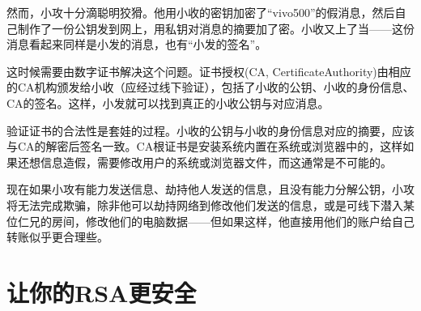 \documentclass[a4paper]{article}         %
\begin{document}
然而，小攻十分滴聪明狡猾。他用小收的密钥加密了“vivo500”的假消息，然后自己制作了一份公钥发到网上，用私钥对消息的摘要加了密。小收又上了当——这份消息看起来同样是小发的消息，也有“小发的签名”。

这时候需要由数字证书解决这个问题。证书授权(CA, \phantom{;}CertificateAuthority)由相应的CA机构颁发给小收（应经过线下验证），包括了小收的公钥、小收的身份信息、CA的签名。这样，小发就可以找到真正的小收公钥与对应消息。

验证证书的合法性是套娃的过程。小收的公钥与小收的身份信息对应的摘要，应该与CA的解密后签名一致。CA根证书是安装系统内置在系统或浏览器中的，这样如果还想信息造假，需要修改用户的系统或浏览器文件，而这通常是不可能的。

现在如果小攻有能力发送信息、劫持他人发送的信息，且没有能力分解公钥，小攻将无法完成欺骗，除非他可以劫持网络到修改他们发送的信息，或是可线下潜入某位仁兄的房间，修改他们的电脑数据——但如果这样，他直接用他们的账户给自己转账似乎更合理些。

\section{让你的RSA更安全}




\end{document}
